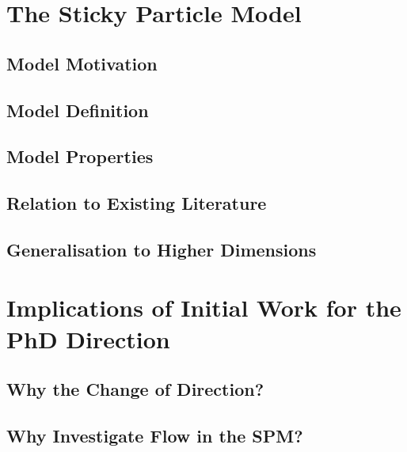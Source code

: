 \section{The Sticky Particle Model}
\subsection{Model Motivation}
\subsection{Model Definition}
\subsection{Model Properties}
\subsection{Relation to Existing Literature}
\subsection{Generalisation to Higher Dimensions}

\section{Implications of Initial Work for the PhD Direction}
\subsection{Why the Change of Direction?}
\subsection{Why Investigate Flow in the SPM?}

